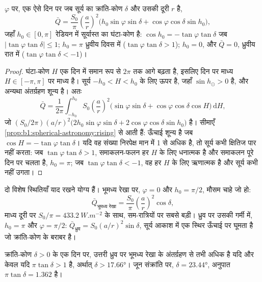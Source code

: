 \begin{theorem}[दैनिक-माध्य अंतर्ग्रहण]\label{thm:b1:radiation-heat-transport:daily}
 $\varphi$ पर, एक ऐसे दिन पर जब सूर्य का क्रांति-कोण $\delta$ और उसकी दूरी $r$ है,
\[
  \bar Q = \frac{S_0}{\pi}\left(\frac{a}{r}\right)^{2}
  \bigl(h_0\sin\varphi\sin\delta + \cos\varphi\cos\delta\sin h_0\bigr),
\]
जहाँ $h_0 \in [0, \pi]$ रेडियन में सूर्यास्त का घंटा-कोण है: $\cos h_0 =
-\tan\varphi\tan\delta$ जब $|\tan\varphi\tan\delta| \le 1$; $h_0 = \pi$ ध्रुवीय दिवस में ($\tan\varphi\tan\delta > 1$); $h_0 = 0$, और $\bar Q = 0$, ध्रुवीय रात में ($\tan\varphi\tan\delta < -1$)।
\end{theorem}

\begin{proof}
घंटा-कोण $H$ एक दिन में समान रूप से $2\pi$ तक आगे बढ़ता है, इसलिए दिन पर माध्य $H \in [-\pi, \pi]$ पर माध्य है। सूर्य $-h_0 < H < h_0$ के लिए ऊपर है, जहाँ $\sin h_\odot > 0$ है, और अन्यथा अंतर्ग्रहण शून्य है। अतः
\[
  \bar Q = \frac{1}{2\pi}\int_{-h_0}^{h_0} S_0\left(\frac{a}{r}\right)^{2}
  \bigl(\sin\varphi\sin\delta + \cos\varphi\cos\delta\cos H\bigr)\,\mathrm dH ,
\]
जो $(S_0/2\pi)(a/r)^2\bigl(2h_0\sin\varphi\sin\delta +
2\cos\varphi\cos\delta\sin h_0\bigr)$ है।
सीमाएँ \cref{prop:b1:spherical-astronomy:rising} से आती हैं: ऊँचाई शून्य है जब $\cos H = -\tan\varphi\tan\delta$। यदि वह संख्या निरपेक्ष मान में 1 से अधिक है, तो सूर्य कभी क्षितिज पार नहीं करता: जब $\tan\varphi\tan\delta > 1$, समाकलन-फलन हर $H$ के लिए धनात्मक है और समाकलन पूरे दिन पर चलता है, $h_0 = \pi$; जब $\tan\varphi\tan\delta < -1$, वह हर $H$ के लिए ऋणात्मक है और सूर्य कभी नहीं उगता।
\end{proof}

दो विशेष स्थितियाँ याद रखने योग्य हैं। भूमध्य रेखा पर, $\varphi = 0$ और $h_0 = \pi/2$, मौसम चाहे जो हो:
\[
  \bar Q_\text{भूमध्य रेखा} = \frac{S_0}{\pi}\left(\frac{a}{r}\right)^{2}\cos\delta ,
\]
माध्य दूरी पर $S_0/\pi = \qty{433.2}{W.m^{-2}}$ के साथ, सम-रात्रियों पर सबसे बड़ी। ध्रुव पर उसकी गर्मी में, $h_0 = \pi$ और $\varphi = \pi/2$: $\bar Q_\text{ध्रुव} =
S_0(a/r)^2\sin\delta$, सूर्य आकाश में एक स्थिर ऊँचाई पर घूमता है जो क्रांति-कोण के बराबर है।

\begin{proposition}[ध्रुवीय ग्रीष्म]\label{prop:b1:radiation-heat-transport:polar-summer}
क्रांति-कोण $\delta > 0$ के एक दिन पर, उत्तरी ध्रुव पर  भूमध्य रेखा के अंतर्ग्रहण से तभी अधिक है यदि और केवल यदि $\pi\tan\delta > 1$ है, अर्थात् $\delta >
\ang{17.66}$। जून संक्रांति पर, $\delta = \ang{23.44}$, अनुपात $\pi\tan
\delta = 1.362$ है।
\end{proposition}

